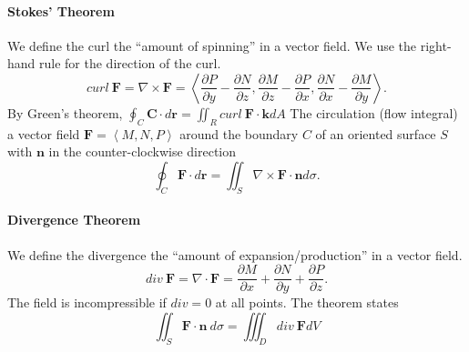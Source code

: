 \paragraph{Stokes' Theorem}
We define the curl the ``amount of spinning'' in a vector field. We use the
right-hand rule for the direction of the curl.
\[curl\: \mathbf{F}=\nabla\times \mathbf{F}=\left<\frac{\partial P}{\partial y} -\frac{\partial N}{\partial z} ,\frac{\partial M}{\partial z} -\frac{\partial P}{\partial x} ,\frac{\partial N}{\partial x} -\frac{\partial M}{\partial y}  \right>.\] 
By Green's theorem, $\oint_C \mathbf{C}\cdot d\mathbf{r}=\iint_R curl\: \mathbf{F}\cdot \mathbf{k}dA$
The circulation (flow integral) a vector field $\mathbf{F}=\left<M,N,P \right>
$ around the boundary $C$ of an oriented surface $S$ with $\mathbf{n}$ in the
counter-clockwise direction
\[\oint_C \mathbf{F}\cdot d\mathbf{r}=\iint_S\nabla\times \mathbf{F\cdot n}d\sigma.\] 

\paragraph{Divergence Theorem}
We define the divergence the ``amount of expansion/production'' in a vector field.
\[div\: \mathbf{F}=\nabla\cdot\mathbf{F}=\frac{\partial M}{\partial x}
+\frac{\partial N}{\partial y} +\frac{\partial P}{\partial z} .\] 
The field is incompressible if $div = 0$ at all points. The theorem states
\[ \iint_S\mathbf{F\cdot n}\:d\sigma=\iiint_D div\:\mathbf{F}dV\]

